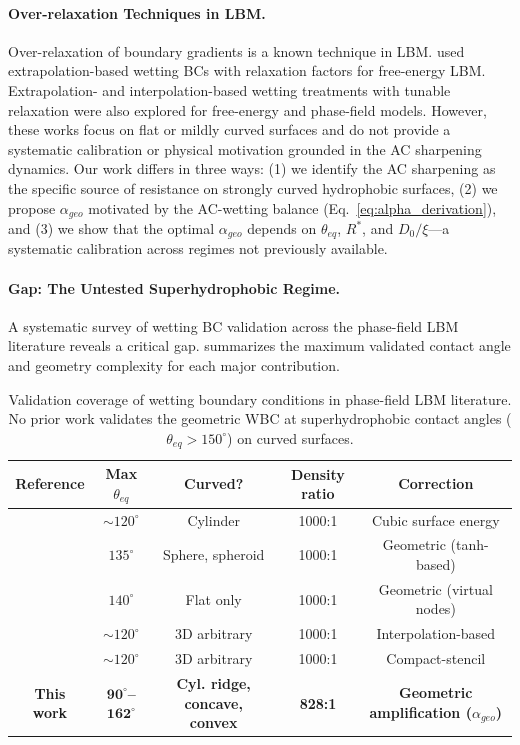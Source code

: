 \paragraph{Over-relaxation Techniques in LBM.}
Over-relaxation of boundary gradients is a known technique in LBM. \citet{ding2007wetting} used extrapolation-based wetting BCs with relaxation factors for free-energy LBM. Extrapolation- and interpolation-based wetting treatments with tunable relaxation were also explored for free-energy and phase-field models. However, these works focus on flat or mildly curved surfaces and do not provide a systematic calibration or physical motivation grounded in the AC sharpening dynamics. Our work differs in three ways: (1) we identify the AC sharpening as the specific source of resistance on strongly curved hydrophobic surfaces, (2) we propose $\alpha_{geo}$ motivated by the AC-wetting balance (Eq.~\ref{eq:alpha_derivation}), and (3) we show that the optimal $\alpha_{geo}$ depends on $\theta_{eq}$, $R^*$, and $D_0/\xi$---a systematic calibration across regimes not previously available.

\paragraph{Gap: The Untested Superhydrophobic Regime.}

A systematic survey of wetting BC validation across the phase-field LBM literature reveals a critical gap.  summarizes the maximum validated contact angle and geometry complexity for each major contribution.

\begin{table}[htbp]
\centering
\caption{Validation coverage of wetting boundary conditions in phase-field LBM literature. No prior work validates the geometric WBC at superhydrophobic contact angles ($\theta_{eq} > 150^\circ$) on curved surfaces.}
\label{tab:lit_validation}
\begin{tabular}{c|c|c|c|c}
\hline
Reference & Max $\theta_{eq}$ & Curved? & Density ratio & Correction \\
\hline
\citet{fakhari2017diffuse} & $\sim 120^\circ$ & Cylinder & 1000:1 & Cubic surface energy \\
\citet{huang2022simplified} & $135^\circ$ & Sphere, spheroid & 1000:1 & Geometric (tanh-based) \\
\citet{zhang2022wetting} & $140^\circ$ & Flat only & 1000:1 & Geometric (virtual nodes) \\
\citet{sashko2024phase} & $\sim 120^\circ$ & 3D arbitrary & 1000:1 & Interpolation-based \\
\citet{compact2025stencil} & $\sim 120^\circ$ & 3D arbitrary & 1000:1 & Compact-stencil \\
\hline
\textbf{This work} & \textbf{$\mathbf{90^\circ}$--$\mathbf{162^\circ}$} & \textbf{Cyl. ridge, concave, convex} & \textbf{828:1} & \textbf{Geometric amplification ($\alpha_{geo}$)} \\
\hline
\end{tabular}
\end{table}

